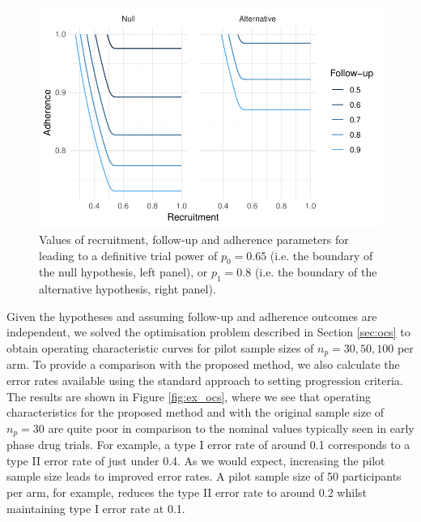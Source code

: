 \documentclass[AMA,STIX1COL]{WileyNJD-v2}
\begin{document}
\begin{figure}
\centering
\includegraphics[scale=0.8]{./Figures/hyps.pdf}
\caption{Values of recruitment, follow-up and adherence parameters for leading to a definitive trial power of $p_0 = 0.65$ (i.e. the boundary of the null hypothesis, left panel), or $p_1 = 0.8$ (i.e. the boundary of the alternative hypothesis, right panel).}
\label{fig:hyps}
\end{figure}

Given the hypotheses and assuming follow-up and adherence outcomes are independent, we solved the optimisation problem described in Section \ref{sec:ocs} to obtain operating characteristic curves for pilot sample sizes of $n_p = 30, 50, 100$ per arm. To provide a comparison with the proposed method, we also calculate the error rates available using the standard approach to setting progression criteria. The results are shown in Figure \ref{fig:ex_ocs}, where we see that operating characteristics for the proposed method and with the original sample size of $n_p = 30$ are quite poor in comparison to the nominal values typically seen in early phase drug trials. For example, a type I error rate of around 0.1 corresponds to a type II error rate of just under 0.4. As we would expect, increasing the pilot sample size leads to improved error rates. A pilot sample size of 50 participants per arm, for example, reduces the type II error rate to around 0.2 whilst maintaining type I error rate at 0.1.
\end{document}

